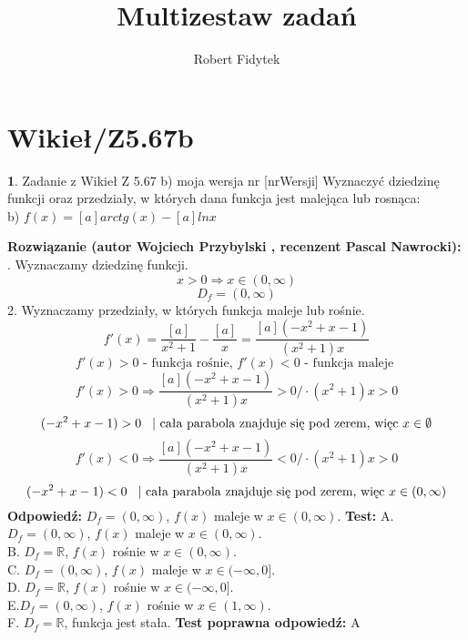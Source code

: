 \documentclass[12pt, a4paper]{article}
\title{Multizestaw zadań}
\author{Robert Fidytek}
\date{}
\theoremstyle{definition} %
\newtheorem{zad}{}
\newcommand{\kategoria}[1]{\section{#1}} %
\newcommand{\zadStart}[1]{\begin{zad}#1\newline} %
\newcommand{\zadStop}{\end{zad}}   %
\newcommand{\rozwStart}[2]{\noindent \textbf{Rozwiązanie (autor #1 , recenzent #2): }\newline} %
\newcommand{\rozwStop}{\newline}                                            %
\newcommand{\odpStart}{\noindent \textbf{Odpowiedź:}\newline}    %
\newcommand{\odpStop}{\newline}                                             %
\newcommand{\testStart}{\noindent \textbf{Test:}\newline} %
\newcommand{\testStop}{\newline} %
\newcommand{\kluczStart}{\noindent \textbf{Test poprawna odpowiedź:}\newline} %
\newcommand{\kluczStop}{\newline} %
\begin{document}
\maketitle


\kategoria{Wikieł/Z5.67b}
\zadStart{Zadanie z Wikieł Z 5.67 b) moja wersja nr [nrWersji]}
Wyznaczyć dziedzinę funkcji oraz przedziały, w których dana funkcja jest malejąca lub rosnąca:\\
b) $f(x)=[a]arctg(x)-[a]lnx$
\zadStop
\rozwStart{Wojciech Przybylski}{Pascal Nawrocki}
1. Wyznaczamy dziedzinę funkcji.
$$x>0 \Rightarrow x\in(0,\infty)$$
$$D_{f}=(0,\infty)$$
2. Wyznaczamy przedziały, w których funkcja maleje lub rośnie. 
$$f'(x)=\frac{[a]}{x^{2}+1}-\frac{[a]}{x}=\frac{[a](-x^{2}+x-1)}{(x^{2}+1)x}$$
$$f'(x)>0 \mbox{ - funkcja rośnie, } f'(x)<0 \mbox{ - funkcja maleje }$$
$$f'(x)>0\Rightarrow \frac{[a](-x^{2}+x-1)}{(x^{2}+1)x}>0 /\cdot(x^{2}+1)x>0$$
$$(-x^{2}+x-1)>0 \hspace{3mm} |\mbox{ cała parabola znajduje się pod zerem, więc }x\in\emptyset$$
$$f'(x)<0\Rightarrow \frac{[a](-x^{2}+x-1)}{(x^{2}+1)x}<0 /\cdot(x^{2}+1)x>0$$
$$(-x^{2}+x-1)<0 \hspace{3mm} |\mbox{ cała parabola znajduje się pod zerem, więc }x\in(0,\infty)$$
\rozwStop
\odpStart
$D_{f}=(0,\infty)$, $f(x)$ maleje w $x\in(0,\infty)$.
\odpStop
\testStart
A. $D_{f}=(0,\infty)$, $f(x)$ maleje w $x\in(0,\infty)$.\\
B. $D_{f}=\mathbb{R}$, $f(x)$ rośnie w $x\in(0,\infty)$.\\
C. $D_{f}=(0,\infty)$, $f(x)$ maleje w $x\in(-\infty,0]$.\\
D. $D_{f}=\mathbb{R}$, $f(x)$ rośnie w $x\in(-\infty,0]$.\\
E.$D_{f}=(0,\infty)$, $f(x)$ rośnie w $x\in(1,\infty)$.\\
F. $D_{f}=\mathbb{R}$, funkcja jest stała.
\testStop
\kluczStart
A
\kluczStop
\end{document}
